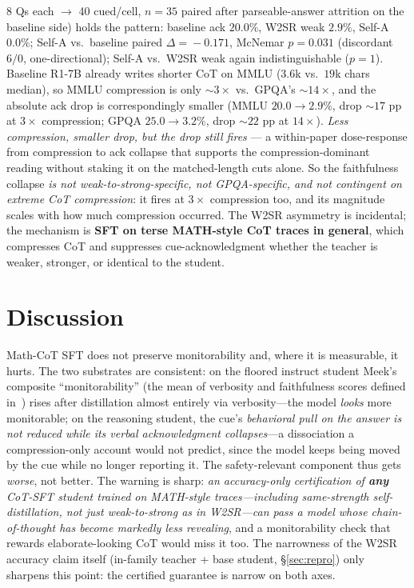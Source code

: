 \documentclass[10pt]{article}
\begin{document}
8 Qs each $\to$ 40 cued/cell, $n\!=\!35$ paired after parseable-answer attrition on
the baseline side) holds the pattern: baseline ack $20.0\%$, W2SR weak $2.9\%$,
Self-A $0.0\%$; Self-A vs.\ baseline paired $\Delta\!=\!-0.171$, McNemar
$p\!=\!0.031$ (discordant $6/0$, one-directional); Self-A vs.\ W2SR weak again
indistinguishable ($p\!=\!1$). Baseline R1-7B already writes shorter CoT on MMLU ($3.6$k vs.\ $19$k
chars median), so MMLU compression is only $\sim$$3\times$ vs.\ GPQA's
$\sim$$14\times$, and the absolute ack drop is correspondingly smaller (MMLU
$20.0\!\to\!2.9\%$, drop $\sim$$17$ pp at $3\times$ compression; GPQA
$25.0\!\to\!3.2\%$, drop $\sim$$22$ pp at $14\times$). \emph{Less compression,
smaller drop, but the drop still fires} --- a within-paper dose-response from
compression to ack collapse that supports the compression-dominant reading
without staking it on the matched-length cuts alone. So the
faithfulness collapse \emph{is not weak-to-strong-specific, not GPQA-specific, and
not contingent on extreme CoT compression}: it fires at $3\times$ compression
too, and its magnitude scales with how much compression occurred. The W2SR asymmetry is incidental; the mechanism is \textbf{SFT on
terse MATH-style CoT traces in general}, which compresses CoT and suppresses
cue-acknowledgment whether the teacher is weaker, stronger, or identical to the
student.

\section{Discussion}
Math-CoT SFT does not preserve monitorability and, where it is measurable, it hurts.
The two substrates are consistent: on the floored instruct student
Meek's composite ``monitorability'' (the mean of verbosity and faithfulness scores
defined in~\cite{meek2025}) rises after distillation almost entirely via
verbosity---the model \emph{looks} more monitorable; on the
reasoning student, the cue's \emph{behavioral pull on the answer is not reduced
while its verbal acknowledgment collapses}---a dissociation a compression-only
account would not predict, since the model keeps being moved by the cue while no
longer reporting it. The safety-relevant component thus gets \emph{worse}, not better. The warning is
sharp: \emph{an accuracy-only certification of \textbf{any} CoT-SFT student trained on
MATH-style traces---including same-strength self-distillation, not just
weak-to-strong as in W2SR---can pass a model whose chain-of-thought has become
markedly less revealing}, and a monitorability check that rewards elaborate-looking
CoT would miss it too. The narrowness of the W2SR accuracy claim itself (in-family
teacher + base student, \S\ref{sec:repro}) only sharpens this point: the certified
guarantee is narrow on both axes.
\end{document}
